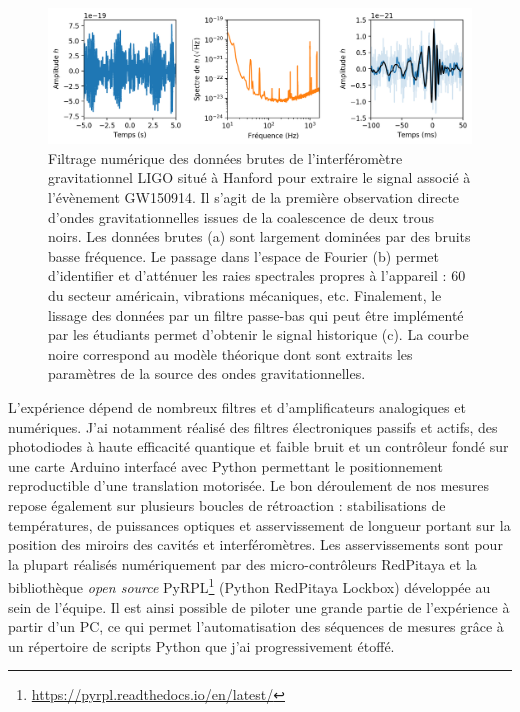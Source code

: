 \documentclass[12pt,a4paper]{article}
\begin{document}
\begin{figure}
\center
\includegraphics[scale=0.75]{figures/GW150914_data.png}
\caption{Filtrage numérique des données brutes de l'interféromètre gravitationnel LIGO situé à Hanford pour extraire le signal associé à l'évènement GW150914.
Il s'agit de la première observation directe d'ondes gravitationnelles issues de la coalescence de deux trous noirs.
Les données brutes (a) sont largement dominées par des bruits basse fréquence.
Le passage dans l'espace de Fourier (b) permet d'identifier et d'atténuer les raies spectrales propres à l'appareil : \unit{60}{\hertz} du secteur américain, vibrations mécaniques, etc.
Finalement, le lissage des données par un filtre passe-bas qui peut être implémenté par les étudiants permet d'obtenir le signal historique (c).
La courbe noire correspond au modèle théorique dont sont extraits les paramètres de la source des ondes gravitationnelles.}
\label{fig:GW150914}
\end{figure}

L'expérience dépend de nombreux filtres et d'amplificateurs analogiques et numériques.
J'ai notamment réalisé des filtres électroniques passifs et actifs, des photodiodes à haute efficacité quantique et faible bruit et un contrôleur fondé sur une carte Arduino interfacé avec Python permettant le positionnement reproductible d'une translation motorisée.
Le bon déroulement de nos mesures repose également sur plusieurs boucles de rétroaction : stabilisations de températures, de puissances optiques et asservissement de longueur portant sur la position des miroirs des cavités et interféromètres.
Les asservissements sont pour la plupart réalisés numériquement par des micro-contrôleurs RedPitaya et la bibliothèque \textit{open source} PyRPL\footnote{\url{https://pyrpl.readthedocs.io/en/latest/}} (Python RedPitaya Lockbox) développée au sein de l'équipe.
Il est ainsi possible de piloter une grande partie de l'expérience à partir d'un PC, ce qui permet l'automatisation des séquences de mesures grâce à un répertoire de scripts Python que j'ai progressivement étoffé.
\end{document}
